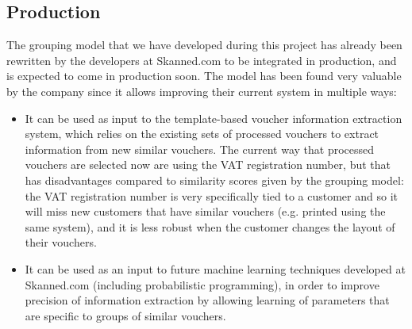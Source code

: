 \documentclass[12pt,a4paper]{article}
\begin{document}
\subsection{Production}
The grouping model that we have developed during this project has already been
rewritten by the developers at Skanned.com to be integrated in production, and
is expected to come in production soon.
The model has been found very valuable by the company since it allows improving their
current system in multiple ways:
\begin{itemize}
\item It can be used as input to the template-based voucher information
  extraction system, which relies on the existing sets of processed vouchers to extract
  information from new similar vouchers. The current way that processed vouchers
  are selected now are using the VAT registration number, but that has
  disadvantages compared to similarity scores given by the grouping model: the
  VAT registration number is very specifically tied to a customer and so it will
  miss new customers that have similar vouchers (e.g. printed using the same
  system), and it is less robust when the customer changes the layout of their vouchers.
\item It can be used as an input to future machine learning techniques developed
  at Skanned.com (including probabilistic programming), in order to improve
  precision of information extraction by allowing learning of parameters that
  are specific to groups of similar vouchers.
\end{itemize}
\end{document}
